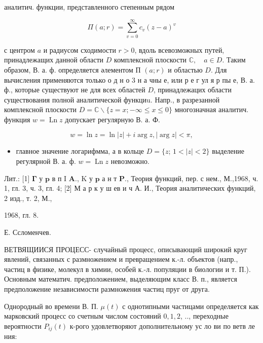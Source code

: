 \documentclass[10pt]{article}
\begin{document}
аналитич. функции, представленного степенным рядом



\[

\Pi(a ; r)=\sum_{v=0}^{\infty} c_{v}(z-a)^{v}

\]



с центром $a$ и радиусом сходимости $r>0$, вдоль всевозможных путей, принадлежащих данной области $D$ комплексной плоскости $\mathbb{C}, \quad a \in D$. Таким образом, В. а. ф. определяется әлементом П $(a ; r)$ и областью $D$. Для вычисления применяются только о д н о 3 н а чны е, или р е г ул я р пы е, В. а. ф., которые существуют не для всех областей $D$, принадлежацих области существования полной аналитической функциu. Напр., в разрезанной комплексной плоскости $D=\mathbb{C} \backslash\{z=x ;-\infty \leqslant x \leqslant 0\}$ многозначная аналитич. функция $w=\operatorname{Ln} z$ допускает регулярную В. а. Ф.



\[

w=\ln z=\ln |z|+i \arg z,|\arg z|<\pi,

\]



\begin{itemize}

  \item главное значение логарифмма, а в кольце $D=\{z$; $1<|z|<2\}$ выделение регулярной В. а. ф. $w=\operatorname{Ln} z$ невозможно.

\end{itemize}



Лит.: [1] $\mathbf{\Gamma}$ у $\mathbf{p}$ в п I $\mathbf{A} .$, K у $\mathbf{p}$ а н т $\mathbf{P} .$, Теория функций, пер. с нем., М.,1968, ч. 1, гл. 3, ч. 3, гл. 4; [2] М а р к у ш ев и ч А. И., Теория аналитических функций, 2 изд., т. 2, М.,

1968, гл. 8.

Е. Ссломенчев.



ВЕТВЯЩИИСЯ ПРОЦЕСС- случайный процесс, описывающий широкий круг явлений, связанных с размножением и превращением к.-л. объектов (напр., частиц в физике, молекул в химии, особей к.-л. популяции в биологии и т. П.). Основным математич. предположением, выделяющим класс В. п., является предположение независимости размножения частиц пруг от друга.



Однородный во времени В. П. $\mu(t)$ с однотипными частицами определяется как марковский процесс со счетным числом состояний $0,1,2$, .., переходные вероятности $P_{i j}(t)$ к-рого удовлетворяют дополнительному ус ло ви по ветв ле ния:
\end{document}
